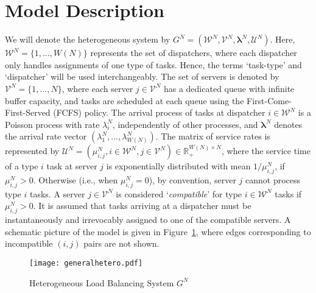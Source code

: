 \documentclass[11pt, reqno]{article}
\numberwithin{equation}{section}
\numberwithin{theorem}{section}
\newcommand{\R}{\mathbb{R}}                 %
\begin{document}
\section{Model Description}\label{ssec:model-contribution}
We will denote the heterogeneous system by $G^N=(\mathcal{W}^N,\mathcal{V}^N,\boldsymbol\lambda^N,\mathcal{U}^N)$. Here, $\mathcal{W}^N=\{1,...,W(N)\}$ represents the set of dispatchers, where each dispatcher only handles assignments of one type of tasks. Hence, the terms `task-type' and `dispatcher' will be used interchangeably. 
The set of servers is denoted by $\mathcal{V}^N=\{1,..., N\}$, where each server $j\in\mathcal{V}^N$ has a dedicated queue with infinite buffer capacity, and tasks are scheduled at each queue using the First-Come-First-Served (FCFS) policy. 
The arrival process of tasks at dispatcher $i\in\mathcal{W}^N$ is a Poisson process with rate $\lambda^N_i$, independently of other processes, and $\boldsymbol\lambda^N$ denotes the arrival rate vector $(\lambda^N_1,...,\lambda^N_{W(N)})$.
The matrix of service rates is represented by $\mathcal{U}^N=(\mu^N_{i,j},i\in\mathcal{W}^N,j\in\mathcal{V}^N)\in \R_+^{W(N)\times N}$, where the service time of a type $i$ task at server $j$ is exponentially distributed with mean $1/\mu^N_{i,j}$, if $\mu^N_{i,j}>0$. Otherwise (i.e., when $\mu^N_{i,j}=0$), by convention, server $j$ cannot process type $i$ tasks. A server $j\in\mathcal{V}^N$ is considered `\textit{compatible}' for type $i\in\mathcal{W}^N$ tasks if $\mu^N_{i,j}>0$. It is assumed that tasks arriving at a dispatcher must be instantaneously and irrevocably assigned to one of the compatible servers.
A schematic picture of the model is given in Figure~\ref{fig:general-hetero}, where edges corresponding to incompatible $(i,j)$ pairs are not shown.
\begin{figure}[h]
    \centering
\texttt{[image: generalhetero.pdf]}
    \caption{Heterogeneous Load Balancing System $G^N$}
    \label{fig:general-hetero}
\end{figure}
\end{document}
